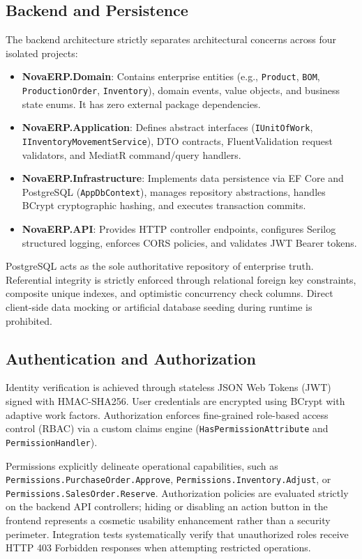 \documentclass[conference]{IEEEtran}
\begin{document}
\subsection{Backend and Persistence}
The backend architecture strictly separates architectural concerns across four isolated projects:
\begin{itemize}
    \item \textbf{NovaERP.Domain}: Contains enterprise entities (e.g., \texttt{Product}, \texttt{BOM}, \texttt{ProductionOrder}, \texttt{Inventory}), domain events, value objects, and business state enums. It has zero external package dependencies.
    \item \textbf{NovaERP.Application}: Defines abstract interfaces (\texttt{IUnitOfWork}, \texttt{IInventoryMovementService}), DTO contracts, FluentValidation request validators, and MediatR command/query handlers.
    \item \textbf{NovaERP.Infrastructure}: Implements data persistence via EF Core and PostgreSQL (\texttt{AppDbContext}), manages repository abstractions, handles BCrypt cryptographic hashing, and executes transaction commits.
    \item \textbf{NovaERP.API}: Provides HTTP controller endpoints, configures Serilog structured logging, enforces CORS policies, and validates JWT Bearer tokens.
\end{itemize}

PostgreSQL acts as the sole authoritative repository of enterprise truth. Referential integrity is strictly enforced through relational foreign key constraints, composite unique indexes, and optimistic concurrency check columns. Direct client-side data mocking or artificial database seeding during runtime is prohibited.

\subsection{Authentication and Authorization}
Identity verification is achieved through stateless JSON Web Tokens (JWT) signed with HMAC-SHA256. User credentials are encrypted using BCrypt with adaptive work factors. Authorization enforces fine-grained role-based access control (RBAC) via a custom claims engine (\texttt{HasPermissionAttribute} and \texttt{PermissionHandler}). 

Permissions explicitly delineate operational capabilities, such as \texttt{Permissions.PurchaseOrder.Approve}, \texttt{Permissions.Inventory.Adjust}, or \texttt{Permissions.SalesOrder.Reserve}. Authorization policies are evaluated strictly on the backend API controllers; hiding or disabling an action button in the frontend represents a cosmetic usability enhancement rather than a security perimeter. Integration tests systematically verify that unauthorized roles receive HTTP 403 Forbidden responses when attempting restricted operations.
\end{document}
